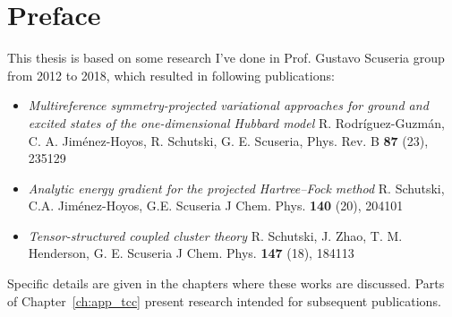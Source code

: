 \section*{Preface}

This thesis is based on some research I've done in Prof. Gustavo Scuseria group 
from 2012 to 2018, which resulted in following publications:

\begin{itemize}
 \item \emph{Multireference symmetry-projected variational approaches for 
ground and excited states of the one-dimensional Hubbard model}
R. Rodríguez-Guzmán, C. A. Jiménez-Hoyos, R. Schutski, G. E. Scuseria,
Phys. Rev. B \textbf{87} (23), 235129
 \item \emph{Analytic energy gradient for the projected Hartree–Fock method}
R. Schutski, C.A. Jiménez-Hoyos, G.E. Scuseria
J Chem. Phys. \textbf{140} (20), 204101
 \item \emph{Tensor-structured coupled cluster theory}
R. Schutski, J. Zhao, T. M. Henderson, G. E. Scuseria
J Chem. Phys. \textbf{147} (18), 184113 
\end{itemize}

Specific details are given in the chapters where these works are discussed. 
Parts of Chapter~\ref{ch:app_tcc} present research intended for subsequent 
publications.